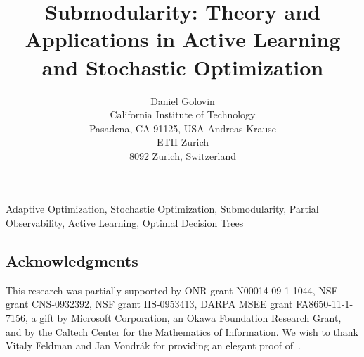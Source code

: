\documentclass{article}
\newcommand{\ourtitle}{\Term Submodularity: Theory and Applications in
  Active Learning and Stochastic Optimization}
\begin{document}
%
  \title{\ourtitle}
  \author{
     \name \!Daniel Golovin  
     \\
     \addr California Institute of Technology\\
     Pasadena, CA 91125, USA
    \AND
     \name Andreas Krause 
     \\                    
     \addr ETH Zurich\\
     8092 Zurich, Switzerland 
     }

%
%
%
%
%
%
%
%
%
%
%


\maketitle

%




\begin{keywords}
Adaptive Optimization, Stochastic Optimization, Submodularity, Partial Observability,
Active Learning, Optimal Decision Trees  
\end{keywords}

%

%

%

%

%

%


%

%

%

%

%

%

%

%

%

%
%



%

%

%

%

%

%

%

%

%

%


%
\subsection*{Acknowledgments}
This research was partially supported by ONR grant N00014-09-1-1044,
NSF grant CNS-0932392, NSF grant IIS-0953413, DARPA MSEE grant FA8650-11-1-7156, a 
gift by Microsoft Corporation, an Okawa Foundation Research Grant, and by the Caltech Center for the Mathematics of Information.
We wish to thank Vitaly Feldman and Jan Vondr\'{a}k for providing an elegant proof of~.
%



%


%

%
\end{document}
